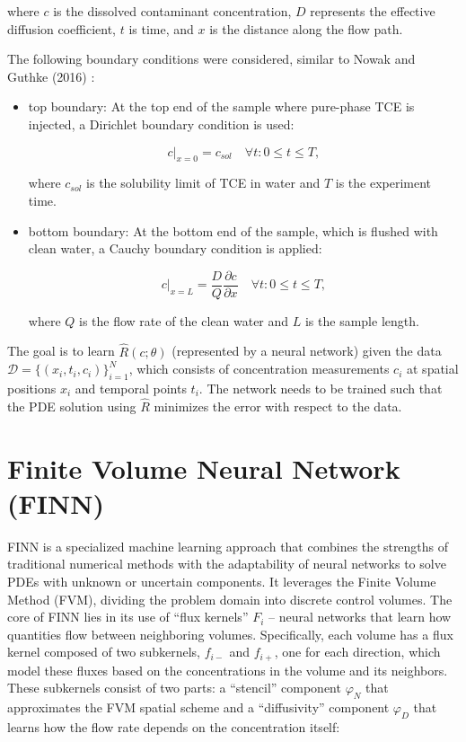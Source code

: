 where $c$ is the dissolved contaminant concentration, $D$ represents the effective diffusion coefficient, $t$ is time, and $x$ is the distance along the flow path.

The following boundary conditions were considered, similar to Nowak and Guthke (2016) \cite{nowak}:

\begin{itemize}
    \item top boundary: At the top end of the sample where pure-phase TCE is injected, a Dirichlet boundary condition is used:

    \begin{equation}
        c|_{x=0} = c_{sol} \quad \forall t : 0 \leq t \leq T,
    \end{equation}

    where $c_{sol}$ is the solubility limit of TCE in water and $T$ is the experiment time.

    \item bottom boundary: At the bottom end of the sample, which is flushed with clean water, a Cauchy boundary condition is applied:

    \begin{equation}
        c|_{x=L} = \frac{D}{Q} \frac{\partial c}{\partial x} \quad \forall t : 0 \leq t \leq T,
    \end{equation}

    where $Q$ is the flow rate of the clean water and $L$ is the sample length.
\end{itemize}

The goal is to learn $\hat{R}(c;\theta)$ (represented by a neural network) given the data $\mathcal{D} = \{ (x_i, t_i, c_i) \}_{i=1}^N$, which consists of concentration measurements $c_i$ at spatial positions $x_i$ and temporal points $t_i$. The network needs to be trained such that the PDE solution using $\hat{R}$ minimizes the error with respect to the data.




\section{Finite Volume Neural Network (FINN)}

FINN \cite{finn} is a specialized machine learning approach that combines the strengths of traditional numerical methods with the adaptability of neural networks to solve PDEs with unknown or uncertain components. It leverages the Finite Volume Method (FVM), dividing the problem domain into discrete control volumes. The core of FINN lies in its use of ``flux kernels'' $F_i$ – neural networks that learn how quantities flow between neighboring volumes. Specifically, each volume has a flux kernel composed of two subkernels, $f_{i-}$ and $f_{i+}$, one for each direction, which model these fluxes based on the concentrations in the volume and its neighbors. These subkernels consist of two parts: a ``stencil'' component $\varphi_N$ that approximates the FVM spatial scheme and a ``diffusivity'' component $\varphi_D$ that learns how the flow rate depends on the concentration itself:

